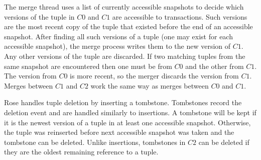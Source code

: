 \documentclass{vldb}
\newcommand{\rows}{Rose\xspace}
\begin{document}
The merge thread uses a list of currently accessible snapshots
to decide which versions of the tuple in $C0$ and $C1$ are accessible
to transactions.  Such versions are the most recent copy of the tuple that
existed before the end of an accessible snapshot.  After finding all
such versions of a tuple (one may exist for each accessible snapshot),
the merge process writes them to the new version of $C1$.  Any other
versions of the tuple are discarded.  If two matching tuples from the
same snapshot are encountered then one must be from $C0$ and the other
from $C1$.  The version from $C0$ is more recent, so the merger
discards the version from $C1$.  Merges between $C1$ and $C2$ work the
same way as merges between $C0$ and $C1$.

\rows handles tuple deletion by inserting a tombstone.  Tombstones
record the deletion event and are handled similarly to insertions.  A
tombstone will be kept if it is the newest version of a tuple in at
least one accessible snapshot.  Otherwise, the tuple was reinserted
before next accessible snapshot was taken and the tombstone can be
deleted.  Unlike insertions, tombstones in $C2$ can be deleted if they
are the oldest remaining reference to a tuple.



\end{document}
